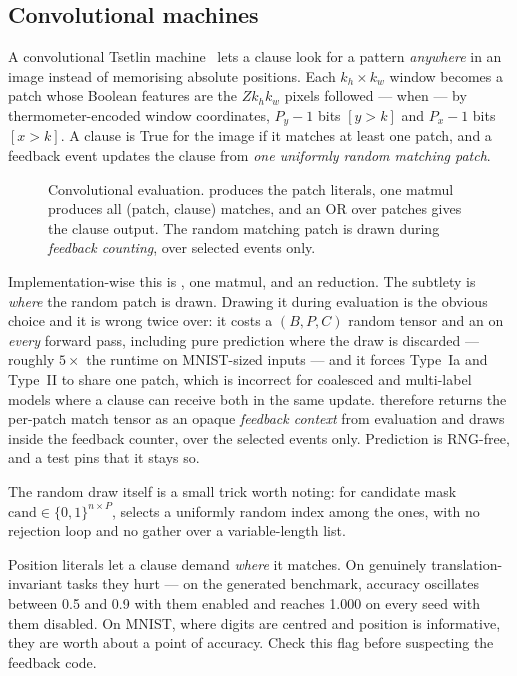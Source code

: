 \subsection{Convolutional machines}
\label{sec:conv}

A convolutional Tsetlin machine~ lets a clause look for a pattern \emph{anywhere} in
an image instead of memorising absolute positions. Each $k_h\times k_w$ window becomes a patch
whose Boolean features are the $Z k_h k_w$ pixels followed --- when
 --- by thermometer-encoded window coordinates, $P_y-1$ bits
$[y > k]$ and $P_x-1$ bits $[x > k]$. A clause is True for the image if it matches at least
one patch, and a feedback event updates the clause from \emph{one uniformly random matching
patch}.

\begin{figure}[htbp]
\centering
\resizebox{\linewidth}{!}{}
\caption{Convolutional evaluation.  produces the patch literals, one matmul
  produces all (patch, clause) matches, and an OR over patches gives the clause output. The
  random matching patch is drawn during \emph{feedback counting}, over selected events only.}
\label{fig:conv}
\end{figure}

Implementation-wise this is , one matmul, and an
 reduction. The subtlety is \emph{where} the random patch is drawn. Drawing it
during evaluation is the obvious choice and it is wrong twice over: it costs a $(B,P,C)$
random tensor and an  on \emph{every} forward pass, including pure prediction
where the draw is discarded --- roughly $5\times$ the runtime on MNIST-sized inputs --- and it
forces Type~Ia and Type~II to share one patch, which is incorrect for coalesced and
multi-label models where a clause can receive both in the same update. \ttlibname therefore
returns the per-patch match tensor as an opaque \emph{feedback context} from evaluation and
draws inside the feedback counter, over the selected events only. Prediction is RNG-free, and
a test pins that it stays so.

The random draw itself is a small trick worth noting: for candidate mask
$\mathrm{cand} \in \{0,1\}^{n\times P}$,  selects a uniformly
random index among the ones, with no rejection loop and no gather over a variable-length list.

\begin{ttcallout}
Position literals let a clause demand \emph{where} it matches. On genuinely
translation-invariant tasks they hurt --- on the generated  benchmark,
accuracy oscillates between 0.5 and 0.9 with them enabled and reaches 1.000 on every seed
with them disabled. On MNIST, where digits are centred and position is informative, they are
worth about a point of accuracy. Check this flag before suspecting the feedback code.
\end{ttcallout}

